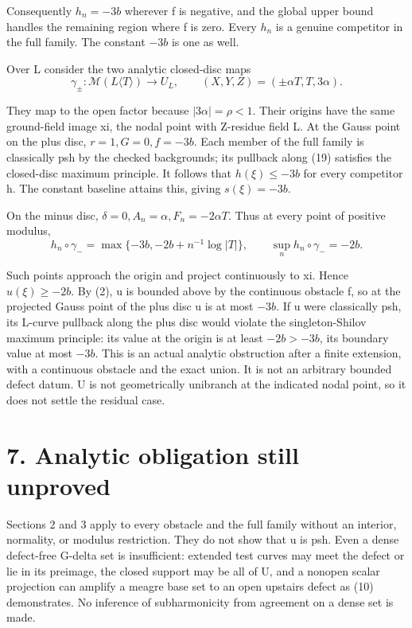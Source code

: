 \documentclass[11pt,a4paper]{article}
\begin{document}
Consequently \(h_n=-3b\) wherever f is negative, and the global upper bound handles the remaining region where f is zero. Every \(h_n\) is a genuine competitor in the full family. The constant \(-3b\) is one as well.

Over L consider the two analytic closed-disc maps
\[
\gamma_\pm:\mathcal M(L\langle T\rangle)\longrightarrow U_L,
\qquad(X,Y,Z)=(\pm\alpha T,T,3\alpha).
\tag{19}
\]

They map to the open factor because \(|3\alpha|=\rho<1\). Their origins have the same ground-field image xi, the nodal point with Z-residue field L. At the Gauss point on the plus disc, \(r=1,G=0,f=-3b\). Each member of the full family is classically psh by the checked backgrounds; its pullback along (19) satisfies the closed-disc maximum principle. It follows that \(h(\xi)\leq-3b\) for every competitor h. The constant baseline attains this, giving \(s(\xi)=-3b\).

On the minus disc, \(\delta=0,A_n=\alpha,F_n=-2\alpha T\). Thus at every point of positive modulus,
\[
h_n\circ\gamma_-=\max\{-3b,-2b+n^{-1}\log|T|\},\qquad
\sup_n h_n\circ\gamma_-=-2b.
\tag{20}
\]

Such points approach the origin and project continuously to xi. Hence \(u(\xi)\geq-2b\). By (2), u is bounded above by the continuous obstacle f, so at the projected Gauss point of the plus disc u is at most \(-3b\). If u were classically psh, its L-curve pullback along the plus disc would violate the singleton-Shilov maximum principle: its value at the origin is at least \(-2b>-3b\), its boundary value at most \(-3b\). This is an actual analytic obstruction after a finite extension, with a continuous obstacle and the exact union. It is not an arbitrary bounded defect datum. U is not geometrically unibranch at the indicated nodal point, so it does not settle the residual case.

\section*{7. Analytic obligation still unproved}

Sections 2 and 3 apply to every obstacle and the full family without an interior, normality, or modulus restriction. They do not show that u is psh. Even a dense defect-free G-delta set is insufficient: extended test curves may meet the defect or lie in its preimage, the closed support may be all of U, and a nonopen scalar projection can amplify a meagre base set to an open upstairs defect as (10) demonstrates. No inference of subharmonicity from agreement on a dense set is made.
\end{document}
